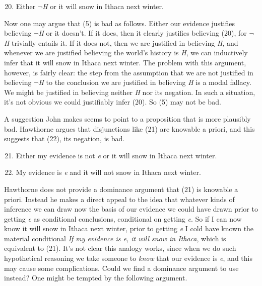\begin{enumerate}
\setcounter{enumi}{19}
\item
  Either \(\neg\)\emph{H} or it will snow in Ithaca next winter.
\end{enumerate}

Now one may argue that (5) is bad as follows. Either our evidence
justifies believing \(\neg\)\emph{H} or it doesn't. If it does, then it
clearly justifies believing (20), for \(\neg\)\emph{H} trivially entails
it. If it does not, then we are justified in believing \emph{H}, and
whenever we are justified believing the world's history is \emph{H}, we
can inductively infer that it will snow in Ithaca next winter. The
problem with this argument, however, is fairly clear: the step from the
assumption that we are not justified in believing \(\neg\)\emph{H} to
the conclusion we are justified in believing \emph{H} is a modal
fallacy. We might be justified in believing neither \emph{H} nor its
negation. In such a situation, it's not obvious we could justifiably
infer (20). So (5) may not be bad.

A suggestion John \citet{Hawthorne2002} makes seems to point to a
proposition that is more plausibly bad. Hawthorne argues that
disjunctions like (21) are knowable a priori, and this suggests that
(22), its negation, is bad.

\begin{enumerate}
\setcounter{enumi}{20}
\item
  Either my evidence is not \emph{e} or it will snow in Ithaca next
  winter.
\item
  My evidence is \emph{e} and it will not snow in Ithaca next winter.
\end{enumerate}

Hawthorne does not provide a dominance argument that (21) is knowable a
priori. Instead he makes a direct appeal to the idea that whatever kinds
of inference we can draw now the basis of our evidence we could have
drawn prior to getting \emph{e} as conditional conclusions, conditional
on getting \emph{e}. So if I can now know it will snow in Ithaca next
winter, prior to getting \emph{e} I cold have known the material
conditional \emph{If my evidence is e, it will snow in Ithaca}, which is
equivalent to (21). It's not clear this analogy works, since when we do
such hypothetical reasoning we take someone to \emph{know} that our
evidence is \emph{e}, and this may cause some complications. Could we
find a dominance argument to use instead? One might be tempted by the
following argument.

